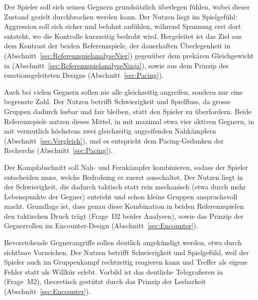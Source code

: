 \documentclass[../Main.tex]{subfiles}
\begin{document}
\begin{description}[style=nextline, leftmargin=0pt, itemsep=0.8em]
    \item[\textbf{Designziel 1: Überlegenheit als Grundzustand}]
    Der Spieler soll sich seinen Gegnern grundsätzlich überlegen fühlen, wobei dieser Zustand gezielt durchbrochen werden kann. Der Nutzen liegt im Spielgefühl: Aggression soll sich sicher und belohnt anfühlen, während Spannung erst dort entsteht, wo die Kontrolle kurzzeitig bedroht wird. Hergeleitet ist das Ziel aus dem Kontrast der beiden Referenzspiele, der dauerhaften Überlegenheit in  (Abschnitt~\ref{sec:ReferenzspielanalyseNier}) gegenüber dem prekären Gleichgewicht in  (Abschnitt~\ref{sec:ReferenzspielanalyseNinja}), sowie aus dem Prinzip des emotionsgeleiteten Designs (Abschnitt~\ref{sec:Pacing}).

    \item[\textbf{Designziel 2: Begrenzung gleichzeitiger Angreifer}]
    Auch bei vielen Gegnern sollen nie alle gleichzeitig angreifen, sondern nur eine begrenzte Zahl. Der Nutzen betrifft Schwierigkeit und Spielfluss, da grosse Gruppen dadurch lesbar und fair bleiben, statt den Spieler zu überfordern. Beide Referenzspiele nutzen dieses Mittel, in  mit maximal etwa vier aktiven Gegnern, in  mit vermutlich höchstens zwei gleichzeitig angreifenden Nahkämpfern (Abschnitt~\ref{sec:Vergleich}), und es entspricht dem Pacing-Gedanken der Recherche (Abschnitt~\ref{sec:Pacing}).

    \item[\textbf{Designziel 3: Ein taktisches Dilemma durch zwei Gegnerrollen}]
    Der Kampfabschnitt soll Nah- und Fernkämpfer kombinieren, sodass der Spieler entscheiden muss, welche Bedrohung er zuerst ausschaltet. Der Nutzen liegt in der Schwierigkeit, die dadurch taktisch statt rein mechanisch (etwa durch mehr Lebenspunkte der Gegner) entsteht und schon kleine Gruppen anspruchsvoll macht. Grundlage ist, dass genau diese Kombination in beiden Referenzspielen den taktischen Druck trägt (Frage~D2 beider Analysen), sowie das Prinzip der Gegnerrollen im Encounter-Design (Abschnitt~\ref{sec:Encounter}).

    \item[\textbf{Designziel 4: Klar telegrafierte Angriffe}]
    Bevorstehende Gegnerangriffe sollen deutlich angekündigt werden, etwa durch sichtbare Vorzeichen. Der Nutzen betrifft Schwierigkeit und Spielgefühl, weil der Spieler auch im Gruppenkampf rechtzeitig reagieren kann und Treffer als eigene Fehler statt als Willkür erlebt. Vorbild ist das deutliche Telegrafieren in  (Frage~M2), theoretisch gestützt durch das Prinzip der Lesbarkeit (Abschnitt~\ref{sec:Encounter}).
\end{description}
\end{document}

